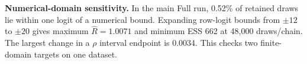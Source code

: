 \textbf{Numerical-domain sensitivity.} In the main Full run, 0.52\% of retained draws lie within one logit of a numerical bound. Expanding row-logit bounds from $\pm12$ to $\pm20$ gives maximum $\widehat R=1.0071$ and minimum ESS 662 at 48,000 draws/chain. The largest change in a $\rho$ interval endpoint is 0.0034. This checks two finite-domain targets on one dataset.
